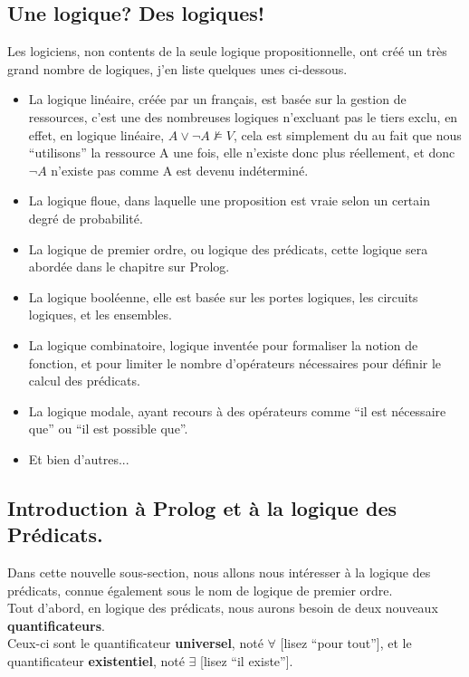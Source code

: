 \documentclass[a4paper, 12pt]{article}
\numberwithin{equation}{subsection}
\begin{document}
\subsection{Une logique? Des logiques!}
Les logiciens, non contents de la seule logique propositionnelle, ont créé un très grand nombre de logiques, j'en liste quelques unes ci-dessous.
\begin{itemize}
  \item La logique linéaire, créée par un français, est basée sur la gestion de ressources, c'est une des nombreuses logiques n'excluant pas le tiers exclu, en effet, en logique linéaire, $A \lor \neg A \nvDash V$, cela est simplement du au fait que nous ``utilisons'' la ressource A une fois, elle n'existe donc plus réellement, et donc $\neg A$ n'existe pas comme A est devenu indéterminé.
  \item La logique floue, dans laquelle une proposition est vraie selon un certain degré de probabilité.
  \item La logique de premier ordre, ou logique des prédicats, cette logique sera abordée dans le chapitre sur Prolog.
  \item La logique booléenne, elle est basée sur les portes logiques, les circuits logiques, et les ensembles.
  \item La logique combinatoire, logique inventée pour formaliser la notion de fonction, et pour limiter le nombre d'opérateurs nécessaires pour définir le calcul des prédicats.
  \item La logique modale, ayant recours à des opérateurs comme ``il est nécessaire que'' ou ``il est possible que''.
  \item Et bien d'autres...
\end{itemize}
\subsection{Introduction à Prolog et à la logique des Prédicats.}
Dans cette nouvelle sous-section, nous allons nous intéresser à la logique des prédicats, connue également sous le nom de logique de premier ordre. \\

Tout d'abord, en logique des prédicats, nous aurons besoin de deux nouveaux {\bf quantificateurs}. \\

Ceux-ci sont le quantificateur {\bf universel}, noté $\forall$ [lisez ``pour tout''], et le quantificateur {\bf existentiel}, noté $\exists$ [lisez ``il existe'']. \\
\end{document}

